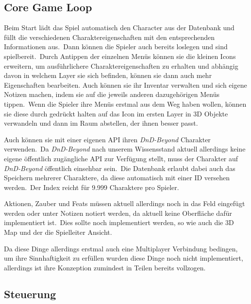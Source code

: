 \subsection{Core Game Loop}\label{subsec:chapter_gameloop}

Beim Start lädt das Spiel automatisch den Character aus der Datenbank und füllt die verschiedenen
Charaktereigenschaften mit den entsprechenden Informationen aus.\ Dann können die Spieler auch bereits loslegen und
sind spielbereit.\ Durch Antippen der einzelnen Menüs können sie die kleinen Icons erweitern, um ausführlichere
Charaktereigenschaften zu erhalten und abhängig davon in welchem Layer sie sich befinden, können sie dann auch mehr
Eigenschaften bearbeiten.
Auch können sie ihr Inventar verwalten und sich eigene Notizen machen, indem sie auf die jeweils anderen dazugehörigen
Menüs tippen.\ Wenn die Spieler ihre Menüs erstmal aus dem Weg haben wollen, können sie diese durch gedrückt halten auf
das Icon im ersten Layer in 3D Objekte verwandeln und dann im Raum abstellen, der ihnen besser passt.\newblock

Auch können sie mit einer eigenen API ihren \textit{DnD-Beyond} Charakter verwenden.\ Da \textit{DnD-Beyond} nach
unserem Wissensstand aktuell allerdings keine eigene öffentlich zugängliche API zur Verfügung stellt, muss der
Charakter auf \textit{DnD-Beyond} öffentlich einsehbar sein.\ Die Datenbank erlaubt dabei auch das Speichern mehrerer
Charaktere, da diese automatisch mit einer ID versehen werden.\ Der Index reicht für 9.999 Charaktere pro Spieler.

Aktionen, Zauber und Feats müssen aktuell allerdings noch in das Feld eingefügt werden oder unter Notizen notiert
werden, da aktuell keine Oberfläche dafür implementiert ist.\ Dies sollte noch implementiert werden, so wie auch die 3D
Map und der die Spielleiter Ansicht.\newblock

Da diese Dinge allerdings erstmal auch eine Multiplayer Verbindung bedingen, um ihre Sinnhaftigkeit zu erfüllen wurden
diese Dinge noch nicht implementiert, allerdings ist ihre Konzeption zumindest in Teilen bereits vollzogen.\newblock

\subsection{Steuerung}\label{subsec:gameplay_controls}

